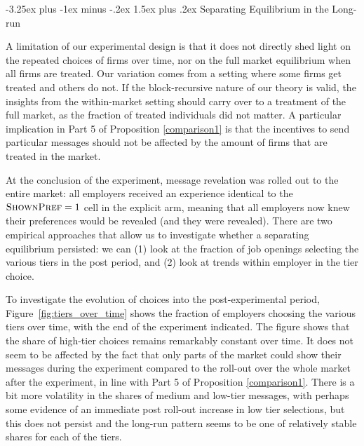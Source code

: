 \documentclass[12pt]{article}
\makeatletter
\renewcommand{\subsection}{%
  \@startsection{subsection}{2}{\z@}%
  {-3.25ex plus -1ex minus -.2ex}%
  {1.5ex plus .2ex}%
  {\normalfont\large\bfseries}%
}
\makeatother
\begin{document}
\subsection{Separating Equilibrium in the Long-run} 

A limitation of our experimental design is that it does not directly shed light on the repeated choices of firms over time, nor on the full market equilibrium when all firms are treated. Our variation comes from a setting where some firms get treated and others do not. If the block-recursive nature of our theory is valid, the insights from the within-market setting should carry over to a treatment of the full market, as the fraction of treated individuals did not matter. A particular implication in Part 5 of Proposition \ref{comparison1} is that the incentives to send particular messages should not be affected by the amount of firms that are treated in the market.

At the conclusion of the experiment, message revelation was rolled out to the entire market: all employers received an experience identical to the ${\textsc{ShownPref} = 1}$ cell in the explicit arm, meaning that all employers now knew their preferences would be revealed (and they were revealed).
There are two empirical approaches that allow us to investigate whether a separating equilibrium persisted:
we can (1) look at the fraction of job openings selecting the various tiers in the post period, and (2) look at trends within employer in the tier choice.


To investigate the evolution of choices into the post-experimental period, Figure~\ref{fig:tiers_over_time} shows the fraction of employers choosing the various tiers over time, with the end of the experiment indicated. The figure shows that the share of high-tier choices remains remarkably constant over time. It does not seem to be affected by the fact that only parts of the market could show their messages during the experiment compared to the roll-out over the whole market after the experiment, in line with Part 5 of Proposition \ref{comparison1}. There is a bit more volatility in the shares of medium and low-tier messages, with perhaps some evidence of an immediate post roll-out increase in low tier selections, but this does not persist and the long-run pattern seems to be one of relatively stable shares for each of the tiers.  
\end{document}
